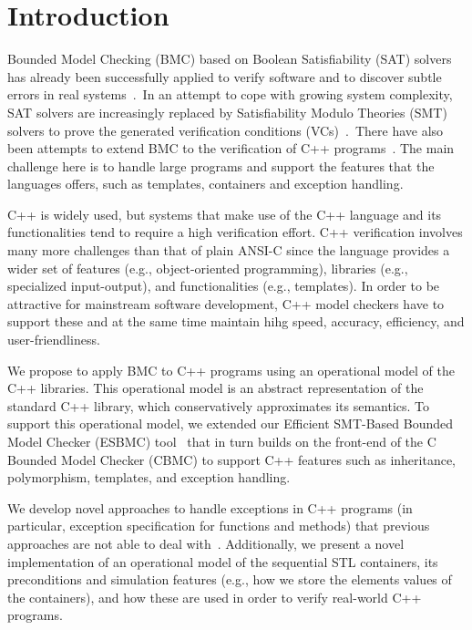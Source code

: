 \documentclass[a4paper]{llncs}
\begin{document}
\section{Introduction}
%
Bounded Model Checking (BMC) based on Boolean Satisfiability (SAT) solvers
has already been successfully applied to verify software and to discover
subtle errors in real systems~\cite{handbook09}.\ In an attempt to cope
with growing system complexity, SAT solvers are increasingly
replaced by Satisfiability Modulo Theories (SMT) solvers to prove the generated
verification conditions (VCs)~\cite{Armando09,Ganai06,Cordeiro12}.\
There have also been attempts to extend BMC to the verification of C++
programs~\cite{Florian12,Yang12}. The main challenge here is to handle large
programs and support the features that the languages offers, such as templates,
containers and exception handling.

C++ is widely used, but systems that make use of the C++ language and its functionalities
tend to require a high verification effort. C++
verification involves many more challenges than that of plain ANSI-C since the language provides
a wider set of features (e.g., object-oriented programming), libraries (e.g., specialized
input-output), and functionalities (e.g., templates). In order to be attractive for mainstream software development,
C++ model checkers have to support these and at the same time maintain 
hihg speed, accuracy, efficiency, and user-friendliness.


We propose to apply 
BMC to C++ programs using an operational model of the C++ libraries. This
operational model is an abstract representation of the standard C++ library, which conservatively
approximates its semantics. To support this operational model, we extended
our Efficient SMT-Based Bounded Model Checker (ESBMC) tool~\cite{Cordeiro12} that in turn builds on
the front-end of the C Bounded Model Checker (CBMC) to support C++ features such
as inheritance, polymorphism, templates, and exception handling.

We develop novel approaches to handle exceptions in C++ programs (in particular,
exception specification for functions and methods) that previous approaches are not
able to deal with~\cite{PrabhuMBIG11,Blanc07,Florian12}. Additionally, we present a
novel implementation of an operational model of the
sequential STL containers, its preconditions and simulation features (e.g., how we
store the elements values of the containers), and how these are
used in order to verify real-world C++ programs.
\end{document}

